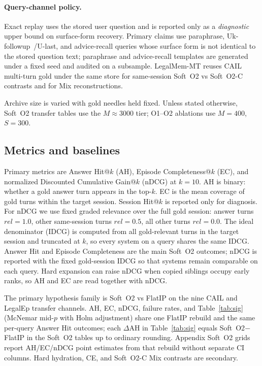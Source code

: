 \documentclass[preprint,12pt,authoryear]{elsarticle}
\begin{document}
\paragraph{Query-channel policy.}
Exact replay uses the stored user question and is reported only as a \emph{diagnostic} upper bound on surface-form recovery.
Primary claims use paraphrase, Uk-followup~/U-last, and advice-recall queries whose surface form is not identical to the stored question text; paraphrase and advice-recall templates are generated under a fixed seed and audited on a subsample.
LegalMem-MT reuses CAIL multi-turn gold under the same store for same-session Soft~O2 vs Soft~O2-C contrasts and for Mix reconstructions.

Archive size is varied with gold needles held fixed.
Unless stated otherwise, Soft~O2 transfer tables use the $M\approx 3000$ tier; O1--O2 ablations use $M{=}400$, $S{=}300$.

\subsection{Metrics and baselines}
Primary metrics are Answer Hit@$k$ (AH), Episode Completeness@$k$ (EC), and normalized Discounted Cumulative Gain@$k$ (nDCG) at $k{=}10$.
AH is binary: whether a gold answer turn appears in the top-$k$.
EC is the mean coverage of gold turns within the target session.
Session Hit@$k$ is reported only for diagnosis.
For nDCG we use fixed graded relevance over the full gold session: answer turns $rel{=}1.0$, other same-session turns $rel{=}0.5$, all other turns $rel{=}0.0$.
The ideal denominator (IDCG) is computed from all gold-relevant turns in the target session and truncated at $k$, so every system on a query shares the same IDCG.
Answer Hit and Episode Completeness are the main Soft~O2 outcomes; nDCG is reported with the fixed gold-session IDCG so that systems remain comparable on each query.
Hard expansion can raise nDCG when copied siblings occupy early ranks, so AH and EC are read together with nDCG.

The primary hypothesis family is Soft~O2 vs FlatIP on the nine CAIL and LegalEp transfer channels.
AH, EC, nDCG, failure rates, and Table~\ref{tab:sig} (McNemar mid-$p$ with Holm adjustment) share one FlatIP rebuild and the same per-query Answer Hit outcomes; each $\Delta$AH in Table~\ref{tab:sig} equals Soft~O2$-$FlatIP in the Soft~O2 tables up to ordinary rounding.
Appendix Soft~O2 grids report AH/EC/nDCG point estimates from that rebuild without separate CI columns.
Hard hydration, CE, and Soft~O2-C Mix contrasts are secondary.
\end{document}
